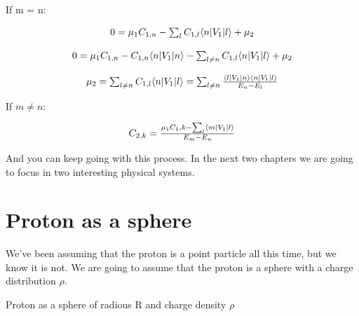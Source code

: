 If m = n:

\begin{equation}
\begin{array}{c}
  0 = \mu_1 C_{1,n} - \sum_l C_{1,l} \langle n\rvert V_1\lvert l\rangle + \mu_2
  \\

  \\
  0 = \mu_1 C_{1,n} - C_{1,n}\langle n\rvert V_1\lvert n\rangle - \sum_{l\neq n} C_{1,l} \langle n\rvert V_1\lvert l\rangle + \mu_2
  \\

  \\
  \mu_2 = \sum_{l\neq n} C_{1,l} \langle n\rvert V_1\lvert l\rangle = \sum_{l\neq n} \frac{\langle l\rvert V_1\lvert n\rangle \langle n\rvert V_1\lvert l\rangle}{E_n - E_l}
\end{array}
\end{equation}

If $m \neq n$:

\begin{equation}
  \begin{array}{c}
    C_{2,k}= \frac{\mu_1 C_1,k - \sum_l \langle m\rvert V_1\lvert l\rangle}{E_m - E_n}
  \end{array}
\end{equation}

And you can keep going with this process. In the next two chapters we are going to focus in two interesting physical systems.

\section{Proton as a sphere}

We've been assuming that the proton is a point particle all this time, but we know it is not. We are going to assume that the proton is a sphere with a charge distribution $\rho$.

\begin{marginfigure}[-4cm]
  \label{figure_proton}
  \caption{Proton as a sphere of radious R and charge density $\rho$}
\end{marginfigure}

